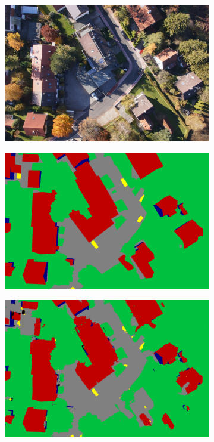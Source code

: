 \begin{figure}[htb]
\begin{subfigure}{0.243\columnwidth}
  \centering
  \includegraphics[width=1\linewidth]{fig/segmentation/DSC00849.JPG}
\end{subfigure}\vspace{1mm}
\begin{subfigure}{0.243\columnwidth}
  \centering
  \includegraphics[width=1\linewidth]{fig/segmentation/DSC00849.png}
\end{subfigure}
\begin{subfigure}{0.243\columnwidth}
  \centering
  \includegraphics[width=1\linewidth]{fig/segmentation/DSC00849_6000_manualcrf.png}

\end{subfigure}
\end{figure}
